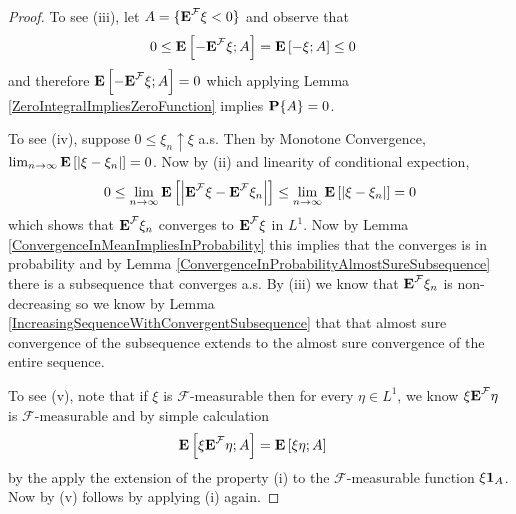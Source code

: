 \begin{proof}
To see (iii), let $A = \lbrace \textbf{E}^{\mathcal{F}} \xi < 0 \rbrace$ and
observe that 
\begin{align*}
0 &\leq \textbf{E}\left[-\textbf{E}^{\mathcal{F}} \xi ; A\right] =
\textbf{E}\left[-\xi ; A\right] \leq 0
\end{align*}
and therefore $\textbf{E}\left[-\textbf{E}^{\mathcal{F}} \xi ; A\right] = 0$
which applying Lemma \ref{ZeroIntegralImpliesZeroFunction} implies
$\textbf{P}\{A\}=0$.

 To see (iv), suppose $0 \leq \xi_n \uparrow \xi$ a.s.  Then by Monotone
 Convergence, $\lim_{n \to \infty} \textbf{E}\left[\left \vert \xi - \xi_n \right \vert\right] =
 0$.  Now by (ii) and linearity of conditional expection, 
\begin{align*}
0 \leq \lim_{n \to \infty} \textbf{E}\left[\left \vert \textbf{E}^{\mathcal{F}} \xi
  - \textbf{E}^{\mathcal{F}} \xi_n \right \vert \right] \leq \lim_{n \to \infty} \textbf{E}\left[\left \vert \xi - \xi_n \right \vert\right] =
 0
\end{align*}
which shows that $\textbf{E}^{\mathcal{F}} \xi_n$ converges to
$\textbf{E}^{\mathcal{F}} \xi$ in $L^1$.  Now by Lemma
\ref{ConvergenceInMeanImpliesInProbability} this
implies that the converges is in probability and by Lemma \ref{ConvergenceInProbabilityAlmostSureSubsequence} there is a
subsequence that converges a.s.  By (iii) we know that $\textbf{E}^{\mathcal{F}} \xi_n$
 is non-decreasing so we know by Lemma \ref{IncreasingSequenceWithConvergentSubsequence} that that almost sure convergence of the
 subsequence extends to the almost sure convergence of the entire sequence.


To see (v), note that if $\xi$ is $\mathcal{F}$-measurable then for
every $\eta \in L^1$, we know $\xi\textbf{E}^{\mathcal{F}} \eta$ is
$\mathcal{F}$-measurable and by simple calculation
\begin{align*}
\textbf{E}\left[\xi\textbf{E}^{\mathcal{F}} \eta; A\right] &= \textbf{E}\left[\xi\eta; A\right]
\end{align*}
by the apply the extension of the property (i) to the
$\mathcal{F}$-measurable function
$\xi\textbf{1}_{A}$.  Now by (v) follows by applying (i) again.


\end{proof}
